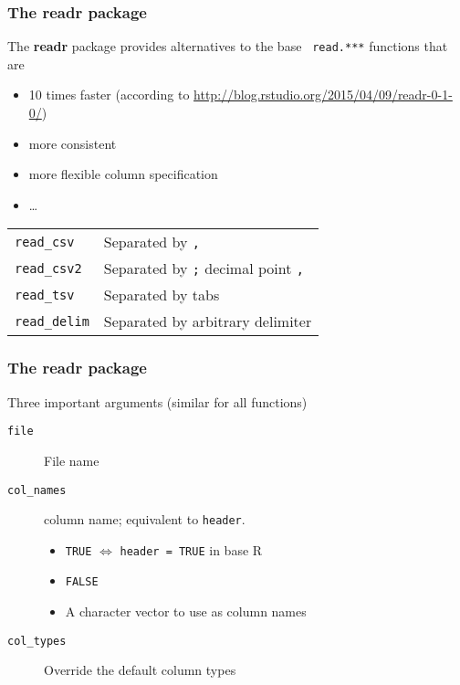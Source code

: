 \documentclass[paper=screen,mathserif]{beamer}\usepackage[]{graphicx}\usepackage[]{color}
\newcommand{\ft}[1]{\frametitle{#1}}
\begin{document}
\begin{frame}[fragile]
  \ft{The {\bf readr} package}
  
  The {\bf readr} package provides alternatives to the base {\tt
    read.***} functions that are
  \begin{itemize}
  \item 10 times faster (according to
    \url{http://blog.rstudio.org/2015/04/09/readr-0-1-0/})
  \item more consistent
  \item more flexible column specification
  \item \dots
  \end{itemize}
  \begin{center}
    \begin{tabular}{p{4cm}p{6cm}}
      {\tt read\_csv}   & Separated by {\tt ,} \\
      {\tt read\_csv2}  & Separated by {\tt ;} decimal point {\tt ,} \\
      {\tt read\_tsv} & Separated by tabs    \\
      {\tt read\_delim} & Separated by arbitrary delimiter    \\
    \end{tabular}
  \end{center}
\end{frame}

\begin{frame}[fragile]
  \ft{The {\bf readr} package}
  
  Three important arguments (similar for all functions)
  \begin{description}
  \item[{\tt file}] File name
  \item[{\tt col\_names}] column name; equivalent to {\tt header}.
    \begin{itemize}
    \item {\tt TRUE} $\Leftrightarrow$ \verb|header = TRUE| in base R
    \item {\tt FALSE}
    \item A character vector to use as column names
    \end{itemize}
  \item[{\tt col\_types}] Override the default column types
  \end{description}
  
\end{frame}
\end{document}
